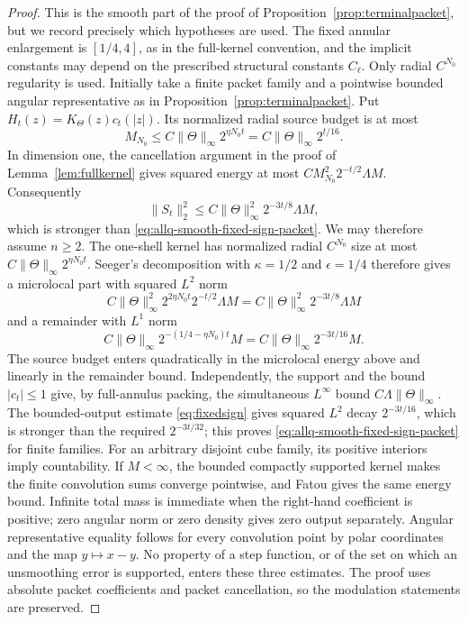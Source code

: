 \documentclass[11pt]{article}
\numberwithin{equation}{section}
\theoremstyle{remark}
\theoremstyle{definition}
\begin{document}
\begin{proof}
This is the smooth part of the proof of
Proposition~\ref{prop:terminalpacket}, but we record precisely which
hypotheses are used.  The fixed annular enlargement is $[1/4,4]$,
as in the full-kernel convention, and the implicit constants may depend
on the prescribed structural constants $C_\ell$.  Only radial
$C^{N_0}$ regularity is used.  Initially take a finite packet family and a
pointwise bounded angular representative as in
Proposition~\ref{prop:terminalpacket}.  Put
$H_t(z)=K_\Theta(z)c_t(|z|)$.  Its normalized radial source budget is
at most
\[
 M_{N_0}\le C\|\Theta\|_\infty2^{\eta N_0t}
 =C\|\Theta\|_\infty2^{t/16}.
\]
In dimension one, the cancellation argument in the proof of
Lemma~\ref{lem:fullkernel} gives squared energy at most
$C M_{N_0}^2 2^{-t/2}\Lambda M$.  Consequently
\[
 \|S_t\|_2^2
 \le C\|\Theta\|_\infty^2 2^{-3t/8}\Lambda M,
\]
which is stronger than \eqref{eq:allq-smooth-fixed-sign-packet}.
We may therefore assume $n\ge2$.  The one-shell kernel has normalized radial
$C^{N_0}$ size at most
$C\|\Theta\|_\infty2^{\eta N_0t}$.  Seeger's decomposition with
$\kappa=1/2$ and $\epsilon=1/4$ therefore gives a microlocal part with
squared $L^2$ norm
\[
 C\|\Theta\|_\infty^2
 2^{2\eta N_0t}2^{-t/2}\Lambda M
 =C\|\Theta\|_\infty^2 2^{-3t/8}\Lambda M
\]
and a remainder with $L^1$ norm
\[
 C\|\Theta\|_\infty
 2^{-(1/4-\eta N_0)t}M
 =C\|\Theta\|_\infty2^{-3t/16}M.
\]
The source budget enters quadratically in the microlocal energy above
and linearly in the remainder bound.  Independently, the support and
the bound $|c_t|\le1$ give, by full-annulus packing, the simultaneous
$L^\infty$ bound
$C\Lambda\|\Theta\|_\infty$.  The bounded-output estimate \eqref{eq:fixedsign} gives squared $L^2$
decay $2^{-3t/16}$, which is stronger than the required $2^{-3t/32}$;
this proves \eqref{eq:allq-smooth-fixed-sign-packet} for finite families.
For an arbitrary disjoint cube family, its positive interiors imply
countability.  If $M<\infty$, the bounded compactly supported kernel
makes the finite convolution sums converge pointwise, and Fatou gives
the same energy bound.  Infinite total mass is immediate when the
right-hand coefficient is positive; zero angular norm or zero density
gives zero output separately.  Angular representative equality follows
for every convolution point by polar coordinates and the map $y\mapsto x-y$.
No property of a step function, or of the set on which an unsmoothing error
is supported, enters these three estimates.  The proof uses absolute
packet coefficients and packet cancellation, so the modulation statements
are preserved.
\end{proof}
\end{document}
